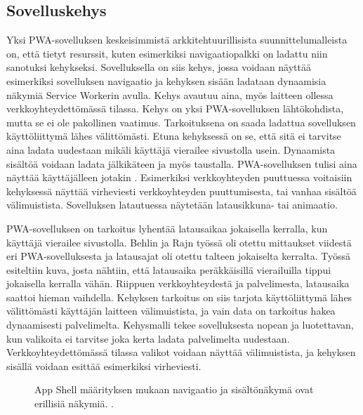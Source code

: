 \documentclass{tktltiki}
\begin{document}
\subsection{Sovelluskehys}

Yksi PWA-sovelluksen keskeisimmistä arkkitehtuurillisista suunnittelumalleista on, että tietyt resurssit, kuten esimerkiksi navigaatiopalkki on ladattu niin sanotuksi kehykseksi. \cite{8441701} Sovelluksella on siis kehys, jossa voidaan näyttää esimerkiksi sovelluksen navigaatio ja kehyksen sisään ladataan dynaamisia näkymiä Service Workerin avulla. Kehys avautuu aina, myös laitteen ollessa verkkoyhteydettömässä tilassa. Kehys on yksi PWA-sovelluksen lähtökohdista, mutta se ei ole pakollinen vaatimus. Tarkoituksena on saada ladattua sovelluksen käyttöliittymä lähes välittömästi. Etuna kehyksessä on se, että sitä ei tarvitse aina ladata uudestaan mikäli käyttäjä vierailee sivustolla usein. Dynaamista sisältöä voidaan ladata jälkikäteen ja myös taustalla. PWA-sovelluksen tulisi aina näyttää käyttäjälleen jotakin \cite{von2018progressive}. Esimerkiksi verkkoyhteyden puuttuessa voitaisiin kehyksessä näyttää virheviesti verkkoyhteyden puuttumisesta, tai vanhaa sisältöä välimuistista. Sovelluksen latautuessa näytetään latausikkuna- tai animaatio.

PWA-sovelluksen on tarkoitus lyhentää latausaikaa jokaisella kerralla, kun käyttäjä vierailee sivustolla. Behlin ja Rajn työssä \cite{8441701} oli otettu mittaukset viidestä eri PWA-sovelluksesta ja latausajat oli otettu talteen jokaiselta kerralta. Työssä esiteltiin kuva, josta nähtiin, että latausaika peräkkäisillä vierailuilla tippui jokaisella kerralla vähän. Riippuen verkkoyhteydestä ja palvelimesta, latausaika saattoi hieman vaihdella. Kehyksen tarkoitus on siis tarjota käyttöliittymä lähes välittömästi käyttäjän laitteen välimuistista, ja vain data on tarkoitus hakea dynaamisesti palvelimelta. Kehysmalli tekee sovelluksesta nopean ja luotettavan, kun valikoita ei tarvitse joka kerta ladata palvelimelta uudestaan. Verkkoyhteydettömässä tilassa valikot voidaan näyttää välimuistista, ja kehyksen sisällä voidaan esittää esimerkiksi virheviesti.

\begin{figure}[h]
\begin{center}
\caption{App Shell määrityksen mukaan navigaatio ja sisältönäkymä ovat erillisiä näkymiä. \cite{Google4}. }
\label{App shell}
\end{center}
\end{figure}
\end{document}
